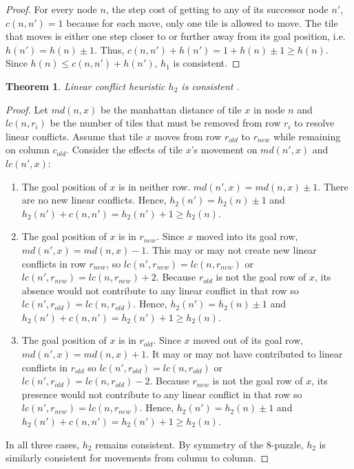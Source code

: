 \documentclass[10pt, a4paper]{article}
\newtheorem{theorem}{Theorem}
\theoremstyle{definition}
\begin{document}
\begin{proof}
  For every node $n$, the step cost of getting to any of its successor node $n'$, $c(n, n') = 1$ because for each move, only one tile is allowed to move. The tile that moves is either one step closer to or further away from its goal position, i.e. $h(n') = h(n) \pm 1$. Thus, $c(n, n') + h(n') = 1 + h(n) \pm 1 \geq h(n)$. Since $h(n) \leq c(n, n') + h(n')$, $h_1$ is consistent.
\end{proof}

\begin{theorem}
  Linear conflict heuristic $h_2$ is consistent \cite[p.~15]{hansson1985generating}.
\end{theorem}

\begin{proof}
  Let $md(n, x)$ be the manhattan distance of tile $x$ in node $n$ and $lc(n, r_i)$ be the number of tiles that must be removed from row $r_i$ to resolve linear conflicts.
  Assume that tile $x$ moves from row $r_{old}$ to $r_{new}$ while remaining on column $c_{old}$. Consider the effects of tile $x$'s movement on $md(n', x)$ and $lc(n', x)$:
  \begin{enumerate}
    \item The goal position of $x$ is in neither row. $md(n', x) = md(n, x) \pm 1$. There are no new linear conflicts. Hence, $h_2(n') = h_2(n) \pm 1$ and $h_2(n') + c(n, n') = h_2(n') + 1 \geq h_2(n)$.
    \item The goal position of $x$ is in $r_{new}$. Since $x$ moved into its goal row, $md(n', x) = md(n, x) - 1$. This may or may not create new linear conflicts in row $r_{new}$, so $lc(n', r_{new}) = lc(n, r_{new})$ or $lc(n', r_{new}) = lc(n, r_{new}) + 2$. Because $r_{old}$ is not the goal row of $x$, its absence would not contribute to any linear conflict in that row so $lc(n', r_{old}) = lc(n, r_{old})$. Hence, $h_2(n') = h_2(n) \pm 1$ and $h_2(n') + c(n, n') = h_2(n') + 1 \geq h_2(n)$.
    \item The goal position of $x$ is in $r_{old}$. Since $x$ moved out of its goal row, $md(n', x) = md(n, x) + 1$. It may or may not have contributed to linear conflicts in $r_{old}$ so $lc(n', r_{old}) = lc(n, r_{old})$ or $lc(n', r_{old}) = lc(n, r_{old}) - 2$. Because $r_{new}$ is not the goal row of $x$, its presence would not contribute to any linear conflict in that row so $lc(n', r_{new}) = lc(n, r_{new})$. Hence, $h_2(n') = h_2(n) \pm 1$ and $h_2(n') + c(n, n') = h_2(n') + 1 \geq h_2(n)$.
  \end{enumerate}
  In all three cases, $h_2$ remains consistent. By symmetry of the 8-puzzle, $h_2$ is similarly consistent for movements from column to column.
\end{proof}
\end{document}

